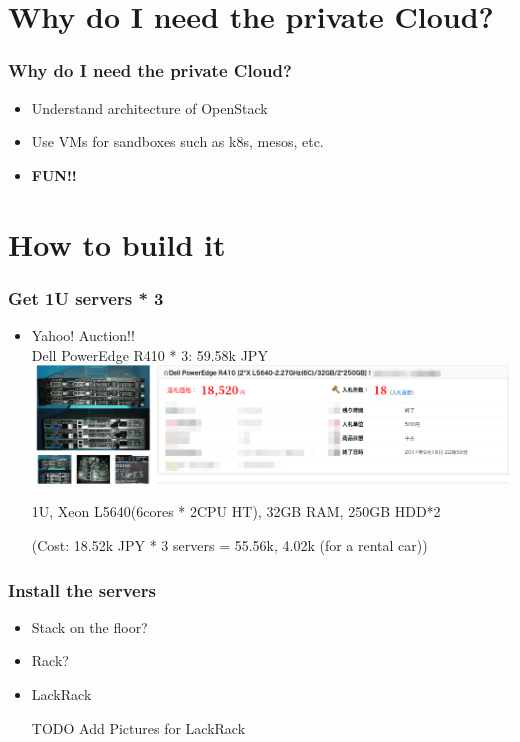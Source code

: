 \documentclass[aspectratio=169,11pt,hyperref={colorlinks=true}]{beamer}
\begin{document}
\section{Why do I need the private Cloud?}
\begin{frame}
  \frametitle{Why do I need the private Cloud?}
  \begin{itemize}
    \item Understand architecture of OpenStack
    \item Use VMs for sandboxes such as k8s, mesos, etc.
    \item \bf{FUN!!}
  \end{itemize}
\end{frame}

\section{How to build it}
\begin{frame}
  \frametitle{Get 1U servers * 3}
  \begin{itemize}
    \item Yahoo! Auction!! \\
      Dell PowerEdge R410 * 3: 59.58k JPY\\
      \includegraphics[scale=1.0]{auction_r410.png}\\
    \item[] 1U, Xeon L5640(6cores * 2CPU HT), 32GB RAM, 250GB HDD*2
    \item[] (Cost: 18.52k JPY * 3 servers = 55.56k, 4.02k (for a rental car))
  \end{itemize}
\end{frame}

\begin{frame}
  \frametitle{Install the servers}
  \begin{itemize}
    \item Stack on the floor?
    \item Rack?
    \item LackRack
    \item [TODO] Add Pictures for LackRack
  \end{itemize}
\end{frame}
\end{document}
